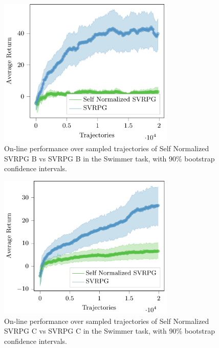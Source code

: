 \begin{figure}[h]
	\begin{minipage}[h]{1\textwidth}
		\centering
		\includegraphics[width=0.75\textwidth]{Images/Experiments/swimmer_SVRPG_vs_sn_SVRPG_B.pdf}
		\vspace{-0.1in}
		\caption{On-line performance over sampled trajectories of Self Normalized \acs{SVRPG} B vs \acs{SVRPG} B in the Swimmer task, with 90\% bootstrap confidence intervals.}
		\label{fig:swimmernine}
	\end{minipage}
	\vspace{-0.15in}
\end{figure}
\begin{figure}[h]
	\begin{minipage}[h]{1\textwidth}
		\centering
		\includegraphics[width=0.75\textwidth]{Images/Experiments/swimmer_SVRPG_vs_sn_SVRPG_C.pdf}
		\vspace{-0.1in}
		\caption{On-line performance over sampled trajectories of Self Normalized \acs{SVRPG} C vs \acs{SVRPG} C in the Swimmer task, with 90\% bootstrap confidence intervals.}
		\label{fig:swimmerten}
	\end{minipage}
	\vspace{-0.15in}
\end{figure}

